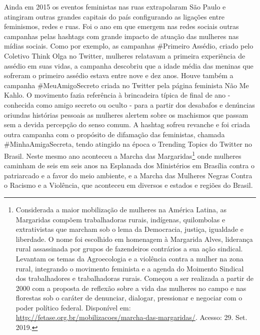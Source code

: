 Ainda em 2015 os eventos feministas nas ruas extrapolaram São Paulo e
atingiram outras grandes capitais do país configurando as ligações entre
feminismos, redes e ruas. Foi o ano em que emergem nas redes sociais
outras campanhas pelas hashtags com grande impacto de atuação das
mulheres nas mídias sociais. Como por exemplo, as campanhas \#Primeiro
Assédio, criado pelo Coletivo Think Olga no Twitter, mulheres relatavam
a primeira experiência de assédio em suas vidas, a campanha descobriu
que a idade média das meninas que sofreram o primeiro assédio estava
entre nove e dez anos. Houve também a campanha \#MeuAmigoSecreto criada
no Twitter pela página feminista Não Me Kahlo. O movimento fazia
referência à brincadeira típica de final de ano - conhecida como amigo
secreto ou oculto - para a partir dos desabafos e denúncias oriundas
histórias pessoais as mulheres alertem sobre os machismos que passam sem
a devida percepção do senso comum. A hashtag sofreu revanche e foi
criada outra campanha com o propósito de difamação das feministas,
chamada \#MinhaAmigaSecreta, tendo atingido na época o Trending Topics
do Twitter no Brasil. Neste mesmo ano aconteceu a Marcha das
Margaridas\footnote{Considerada a maior mobilização de mulheres na
  América Latina, as Margaridas compõem trabalhadoras rurais, indígenas,
  quilombolas e extrativistas que marcham sob o lema da Democracia,
  justiça, igualdade e liberdade. O nome foi escolhido em homenagem à
  Margarida Alves, liderança rural assassinada por grupos de fazendeiros
  contrários a sua ação sindical. Levantam os temas da Agroecologia e a
  violência contra a mulher na zona rural, integrando o movimento
  feminista e a agenda do Moimento Sindical dos trabalhadores e
  trabalhadoras rurais. Começou a ser realizada a partir de 2000 com a
  proposta de reflexão sobre a vida das mulheres no campo e nas
  florestas sob o caráter de denunciar, dialogar, pressionar e negociar
  com o poder político federal. Disponível em:
  \url{http://fetase.org.br/mobilizacoes/marcha-das-margaridas/}.
  Acesso: 29. Set. 2019.} onde mulheres caminham de seis em seis anos na
Esplanada dos Ministérios em Brasília contra o patriarcado e a favor do
meio ambiente, e a Marcha das Mulheres Negras Contra o Racismo e a
Violência, que aconteceu em diversos e estados e regiões do Brasil.

